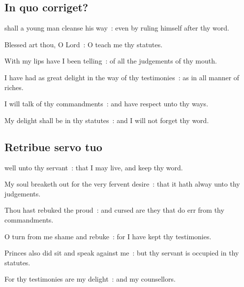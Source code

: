 \subsection{In quo corriget?}


 shall a young man cleanse his way~: even by ruling himself after thy word.\par
{}
Blessed art thou, O Lord~: O teach me thy statutes.\par
{}With my lips have I been telling~: of all the judgements of thy mouth.\par
{}I have had as great delight in the way of thy testimonies~: as in all manner of riches.\par
{}I will talk of thy commandments~: and have respect unto thy ways.\par
{}My delight shall be in thy statutes~: and I will not forget thy word.\par

\subsection{Retribue servo tuo}


 well unto thy servant~: that I may live, and keep thy word.\par
{}
My soul breaketh out for the very fervent desire~: that it hath alway unto thy judgements.\par
{}Thou hast rebuked the proud~: and cursed are they that do err from thy commandments.\par
{}O turn from me shame and rebuke~: for I have kept thy testimonies.\par
{}Princes also did sit and speak against me~: but thy servant is occupied in thy statutes.\par
{}For thy testimonies are my delight~: and my counsellors.\par

